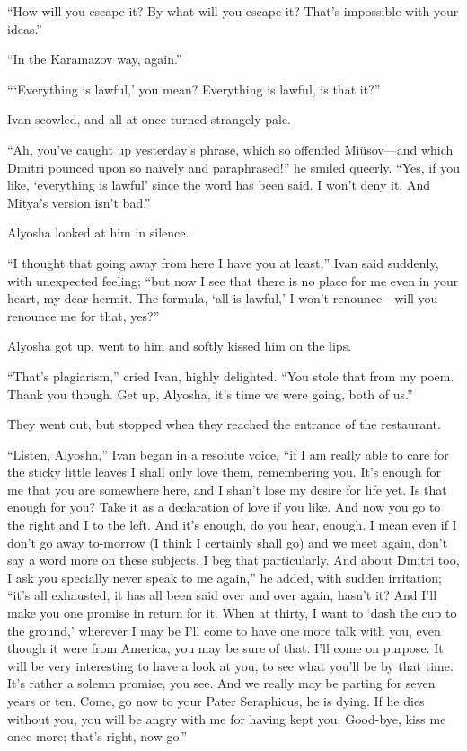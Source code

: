 ``How will you escape it? By what will you escape it? That's
impossible with your ideas.''

``In the Karamazov way, again.''

```Everything is lawful,' you mean? Everything is lawful, is that
it?''

Ivan scowled, and all at once turned strangely pale.

``Ah, you've caught up yesterday's phrase, which so offended
Mi\"{u}\-sov---and which Dmitri pounced upon so na\"{i}vely and
paraphrased!'' he smiled queerly. ``Yes, if you like, `everything is
lawful' since the word has been said. I won't deny it. And Mitya's
version isn't bad.''

Alyosha looked at him in silence.

``I thought that going away from here I have you at least,'' Ivan said
suddenly, with unexpected feeling; ``but now I see that there is no
place for me even in your heart, my dear hermit. The formula, `all is
lawful,' I won't re\-nounce---will you renounce me for that, yes?''

Alyosha got up, went to him and softly kissed him on the lips.

``That's plagiarism,'' cried Ivan, highly delighted. ``You stole that
from my poem. Thank you though. Get up, Alyosha, it's time we were
going, both of us.''

They went out, but stopped when they reached the entrance of the
restaurant.

``Listen, Alyosha,'' Ivan began in a resolute voice, ``if I am really
able to care for the sticky little leaves I shall only love them,
remembering you. It's enough for me that you are somewhere here, and I
shan't lose my desire for life yet. Is that enough for you? Take it as
a declaration of love if you like. And now you go to the right and I
to the left. And it's enough, do you hear, enough. I mean even if I
don't go away to-morrow (I think I certainly shall go) and we meet
again, don't say a word more on these subjects. I beg that
particularly. And about Dmitri too, I ask you specially never speak to
me again,'' he added, with sudden irritation; ``it's all exhausted, it
has all been said over and over again, hasn't it? And I'll make you
one promise in return for it. When at thirty, I want to `dash the cup
to the ground,' wherever I may be I'll come to have one more talk with
you, even though it were from America,  you may be sure of
that. I'll come on purpose. It will be very interesting to have a look
at you, to see what you'll be by that time. It's rather a solemn
promise, you see. And we really may be parting for seven years or ten.
Come, go now to your Pater Seraphicus, he is dying. If he dies without
you, you will be angry with me for having kept you. Good-bye, kiss me
once more; that's right, now go.''


